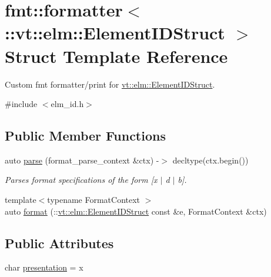 \hypertarget{structfmt_1_1formatter_3_1_1vt_1_1elm_1_1_element_i_d_struct_01_4}{}\section{fmt\+:\+:formatter$<$\+:\+:vt\+:\+:elm\+:\+:Element\+I\+D\+Struct $>$ Struct Template Reference}
\label{structfmt_1_1formatter_3_1_1vt_1_1elm_1_1_element_i_d_struct_01_4}


Custom fmt formatter/print for {\ttfamily \hyperlink{structvt_1_1elm_1_1_element_i_d_struct}{vt\+::elm\+::\+Element\+I\+D\+Struct}}.  




{\ttfamily \#include $<$elm\+\_\+id.\+h$>$}

\subsection*{Public Member Functions}
\begin{DoxyCompactItemize}
\item 
auto \hyperlink{structfmt_1_1formatter_3_1_1vt_1_1elm_1_1_element_i_d_struct_01_4_af147b664199916fcbb5c2c1d69c0bac6}{parse} (format\+\_\+parse\+\_\+context \&ctx) -\/$>$ decltype(ctx.\+begin())
\begin{DoxyCompactList}\small\item\em Parses format specifications of the form \mbox{[}\textquotesingle{}x\textquotesingle{} $\vert$ \textquotesingle{}d\textquotesingle{} $\vert$ \textquotesingle{}b\textquotesingle{}\mbox{]}. \end{DoxyCompactList}\item 
{\footnotesize template$<$typename Format\+Context $>$ }\\auto \hyperlink{structfmt_1_1formatter_3_1_1vt_1_1elm_1_1_element_i_d_struct_01_4_a2b6b6f1e2222550b5ce165881cfb1448}{format} (\+::\hyperlink{structvt_1_1elm_1_1_element_i_d_struct}{vt\+::elm\+::\+Element\+I\+D\+Struct} const \&e, Format\+Context \&ctx)
\end{DoxyCompactItemize}
\subsection*{Public Attributes}
\begin{DoxyCompactItemize}
\item 
char \hyperlink{structfmt_1_1formatter_3_1_1vt_1_1elm_1_1_element_i_d_struct_01_4_af4ff8d1310326d50c5190b346197d424}{presentation} = \textquotesingle{}x\textquotesingle{}
\end{DoxyCompactItemize}


